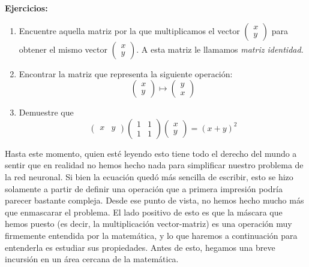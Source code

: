 \textbf{Ejercicios:}

\begin{enumerate}
    \item Encuentre aquella matriz por la que multiplicamos el vector $\begin{pmatrix}
        x \\ y
    \end{pmatrix}$ para obtener el mismo vector $\begin{pmatrix}
        x \\ y
    \end{pmatrix}$. A esta matriz le llamamos \textit{matriz identidad}.
    \item Encontrar la matriz que representa la siguiente operación:
    \[ \begin{pmatrix}
        x \\ y 
    \end{pmatrix} \mapsto \begin{pmatrix}
        y \\ x
    \end{pmatrix}\]
    \item Demuestre que
    \[ \begin{pmatrix}
        x & y
    \end{pmatrix} \begin{pmatrix}
        1 & 1 \\ 1 & 1
    \end{pmatrix} \begin{pmatrix}
        x \\ y
    \end{pmatrix} = (x + y)^2\]
\end{enumerate}

\begin{tcolorbox}[title=Comentario]
    Hasta este momento, quien esté leyendo esto tiene todo el derecho del mundo a sentir que en realidad no hemos hecho nada para simplificar nuestro problema de la red neuronal. Si bien la ecuación quedó más sencilla de escribir, esto se hizo solamente a partir de definir una operación que a primera impresión podría parecer bastante compleja. Desde ese punto de vista, no hemos hecho mucho más que enmascarar el problema. El lado positivo de esto es que la máscara que hemos puesto (es decir, la multiplicación vector-matriz) es una operación muy firmemente entendida por la matemática, y lo que haremos a continuación para entenderla es estudiar sus propiedades. Antes de esto, hegamos una breve incursión en un área cercana de la matemática.
\end{tcolorbox}

